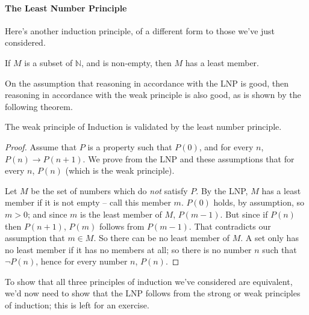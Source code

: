 \paragraph{The Least Number Principle} Here's another induction principle, of a different form to those we've just considered.
\begin{definition} If $M$ is a subset of $\mathbb{N}$, and is non-empty, then $M$ has a least member.\end{definition}
On the assumption that reasoning in accordance with the LNP is good, then reasoning in accordance with the weak principle is also good, as is shown by the following theorem.
\begin{theorem} The weak principle of Induction \label{lnpweak} is validated by the least number principle. \begin{proof} Assume that $P$ is a property such that $P(0)$, and for every $n$, $P(n) \to P(n+1)$. We prove from the LNP and these assumptions that for every $n$, $P(n)$ (which is the weak principle).
  
Let $M$ be the set of numbers which do \emph{not} satisfy $P$. By the LNP, $M$ has a least member if it is not empty – call this member $m$. $P(0)$ holds, by assumption, so $m>0$; and since $m$ is the least member of $M$, $P(m-1)$. But since if $P(n)$ then $P(n+1)$, $P(m)$ follows from $P(m-1)$. That contradicts our assumption that $m \in M$. So there can be no least member of $M$. A set only has no least member if it has no members at all; so there is no number $n$ such that $\neg P(n)$, hence for every number $n$, $P(n)$.\end{proof}\end{theorem}

To show that all three principles of induction we've considered are equivalent, we'd now need to show that the LNP follows from the strong or weak principles of induction; this is left for an exercise.


